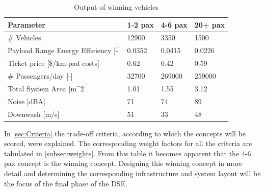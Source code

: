 \begin{table}[h]
\centering
\captionsetup{justification=centering}
\caption{Output of winning vehicles}
\label{outputswin}
\begin{tabular}{@{}llll@{}}
\toprule
\textbf{Parameter}                                          & \textbf{1-2 pax} & \textbf{4-6 pax} & \textbf{20+ pax}  \\ \midrule
\# Vehicles                                                 &      12900             &     3350             & 1500       \\
Payload Range Energy Efficiency    {[}-{]}                      &     0.0352           &       0.0415          & 0.0226          \\
Ticket price {[}\$/km-pad costs{]}                          &   0.62             &    0.42              & 0.59       \\
\# Passengers/day {[}-{]}                                   &    32700           &     269000             & 259000      \\
Total System Area {[}m\textasciicircum{}2                   &    1.01          &       1.55           & 3.12    \\
Noise {[}dBA{]}                                             &      71             &       74           & 89      \\ 
Downwash {[}m/s{]}                                          &      51            &       33              &   48  \\ \bottomrule
\end{tabular}
\end{table}


In \autoref{sec:Criteria} the trade-off criteria, according to which the concepts will be scored, were explained. The corresponding weight factors for all the criteria are tabulated in \autoref{subsec:weights}. 
From this table it becomes apparent that the 4-6 pax concept is the winning concept. Designing this winning concept in more detail and determining the corresponding infrastructure and system layout will be the focus of the final phase of the DSE. 

